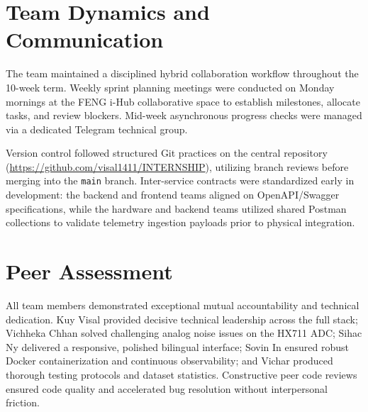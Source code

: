 \documentclass[11pt,a4paper]{report}
\begin{document}
\section{Team Dynamics and Communication}
The team maintained a disciplined hybrid collaboration workflow throughout the 10-week term. Weekly sprint planning meetings were conducted on Monday mornings at the FENG i-Hub collaborative space to establish milestones, allocate tasks, and review blockers. Mid-week asynchronous progress checks were managed via a dedicated Telegram technical group. 

Version control followed structured Git practices on the central repository (\url{https://github.com/visal1411/INTERNSHIP}), utilizing branch reviews before merging into the \texttt{main} branch. Inter-service contracts were standardized early in development: the backend and frontend teams aligned on OpenAPI/Swagger specifications, while the hardware and backend teams utilized shared Postman collections to validate telemetry ingestion payloads prior to physical integration.

\section{Peer Assessment}
All team members demonstrated exceptional mutual accountability and technical dedication. Kuy Visal provided decisive technical leadership across the full stack; Vichheka Chhan solved challenging analog noise issues on the HX711 ADC; Sihac Ny delivered a responsive, polished bilingual interface; Sovin In ensured robust Docker containerization and continuous observability; and Vichar produced thorough testing protocols and dataset statistics. Constructive peer code reviews ensured code quality and accelerated bug resolution without interpersonal friction.
\end{document}
